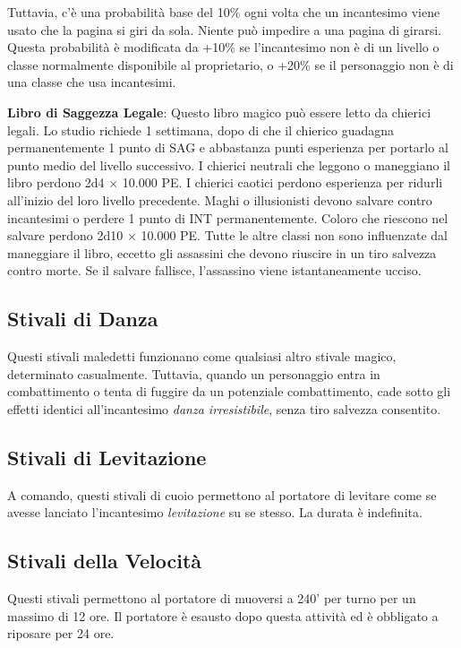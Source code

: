 \documentclass{article}
\begin{document}
\begin{multicols}{2}
Tuttavia, c'è una probabilità base del 10\% ogni volta che un incantesimo viene usato che la pagina si giri da sola. Niente può impedire a una pagina di girarsi. Questa probabilità è modificata da +10\% se l'incantesimo non è di un livello o classe normalmente disponibile al proprietario, o +20\% se il personaggio non è di una classe che usa incantesimi.

\textbf{Libro di Saggezza Legale}: Questo libro magico può essere letto da chierici legali. Lo studio richiede 1 settimana, dopo di che il chierico guadagna permanentemente 1 punto di SAG e abbastanza punti esperienza per portarlo al punto medio del livello successivo. I chierici neutrali che leggono o maneggiano il libro perdono 2d4 × 10.000 PE. I chierici caotici perdono esperienza per ridurli all'inizio del loro livello precedente. Maghi o illusionisti devono salvare contro incantesimi o perdere 1 punto di INT permanentemente. Coloro che riescono nel salvare perdono 2d10 × 10.000 PE. Tutte le altre classi non sono influenzate dal maneggiare il libro, eccetto gli assassini che devono riuscire in un tiro salvezza contro morte. Se il salvare fallisce, l'assassino viene istantaneamente ucciso.

\subsection{Stivali di Danza}
Questi stivali maledetti funzionano come qualsiasi altro stivale magico, determinato casualmente. Tuttavia, quando un personaggio entra in combattimento o tenta di fuggire da un potenziale combattimento, cade sotto gli effetti identici all'incantesimo \textit{danza irresistibile}, senza tiro salvezza consentito.

\subsection{Stivali di Levitazione}
A comando, questi stivali di cuoio permettono al portatore di levitare come se avesse lanciato l'incantesimo \textit{levitazione} su se stesso. La durata è indefinita.

\subsection{Stivali della Velocità}
Questi stivali permettono al portatore di muoversi a 240' per turno per un massimo di 12 ore. Il portatore è esausto dopo questa attività ed è obbligato a riposare per 24 ore.


\end{multicols}
\end{document}
